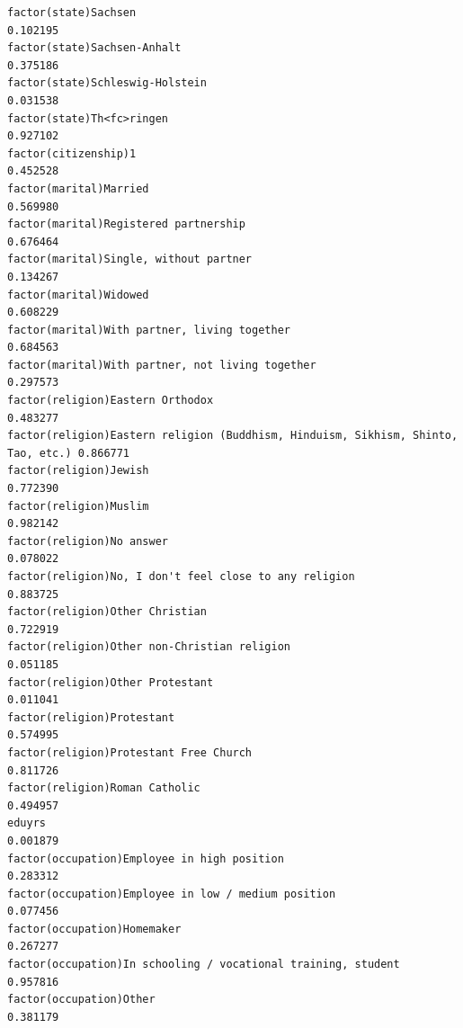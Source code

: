 \documentclass[
]{article}
\begin{document}
\begin{table}
\begin{minipage}[t]{\linewidth}
{\begin{verbatim}
factor(state)Sachsen                                                              0.102195
factor(state)Sachsen-Anhalt                                                       0.375186
factor(state)Schleswig-Holstein                                                   0.031538
factor(state)Th<fc>ringen                                                         0.927102
factor(citizenship)1                                                              0.452528
factor(marital)Married                                                            0.569980
factor(marital)Registered partnership                                             0.676464
factor(marital)Single, without partner                                            0.134267
factor(marital)Widowed                                                            0.608229
factor(marital)With partner, living together                                      0.684563
factor(marital)With partner, not living together                                  0.297573
factor(religion)Eastern Orthodox                                                  0.483277
factor(religion)Eastern religion (Buddhism, Hinduism, Sikhism, Shinto, Tao, etc.) 0.866771
factor(religion)Jewish                                                            0.772390
factor(religion)Muslim                                                            0.982142
factor(religion)No answer                                                         0.078022
factor(religion)No, I don't feel close to any religion                            0.883725
factor(religion)Other Christian                                                   0.722919
factor(religion)Other non-Christian religion                                      0.051185
factor(religion)Other Protestant                                                  0.011041
factor(religion)Protestant                                                        0.574995
factor(religion)Protestant Free Church                                            0.811726
factor(religion)Roman Catholic                                                    0.494957
eduyrs                                                                            0.001879
factor(occupation)Employee in high position                                       0.283312
factor(occupation)Employee in low / medium position                               0.077456
factor(occupation)Homemaker                                                       0.267277
factor(occupation)In schooling / vocational training, student                     0.957816
factor(occupation)Other                                                           0.381179

\end{verbatim}}
\end{minipage}
\end{table}
\end{document}
